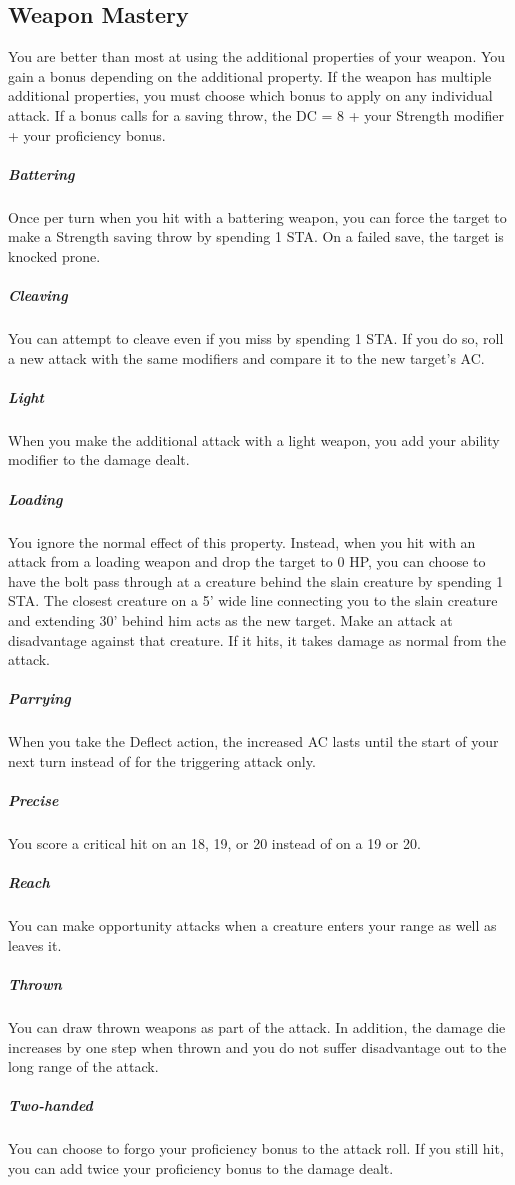 \subsection{Weapon Mastery}

You are better than most at using the additional properties of your weapon. You gain a bonus depending on the additional property. If the weapon has multiple additional properties, you must choose which bonus to apply on any individual attack. If a bonus calls for a saving throw, the DC = 8 + your Strength modifier + your proficiency bonus.

\subparagraph*{Battering} Once per turn when you hit with a battering weapon, you can force the target to make a Strength saving throw by spending 1 STA. On a failed save, the target is knocked prone.

\subparagraph*{Cleaving} You can attempt to cleave even if you miss by spending 1 STA. If you do so, roll a new attack with the same modifiers and compare it to the new target's AC.

\subparagraph*{Light} When you make the additional attack with a light weapon, you add your ability modifier to the damage dealt.

\subparagraph*{Loading} You ignore the normal effect of this property. Instead, when you hit with an attack from a loading weapon and drop the target to 0 HP, you can choose to have the bolt pass through at a creature behind the slain creature by spending 1 STA. The closest creature on a 5' wide line connecting you to the slain creature and extending 30' behind him acts as the new target. Make an attack at disadvantage against that creature. If it hits, it takes damage as normal from the attack.

\subparagraph*{Parrying} When you take the Deflect action, the increased AC lasts until the start of your next turn instead of for the triggering attack only.

\subparagraph*{Precise} You score a critical hit on an 18, 19, or 20 instead of on a 19 or 20.

\subparagraph*{Reach} You can make opportunity attacks when a creature enters your range as well as leaves it.

\subparagraph*{Thrown} You can draw thrown weapons as part of the attack. In addition, the damage die increases by one step when thrown and you do not suffer disadvantage out to the long range of the attack.

\subparagraph*{Two-handed} You can choose to forgo your proficiency bonus to the attack roll. If you still hit, you can add twice your proficiency bonus to the damage dealt.


